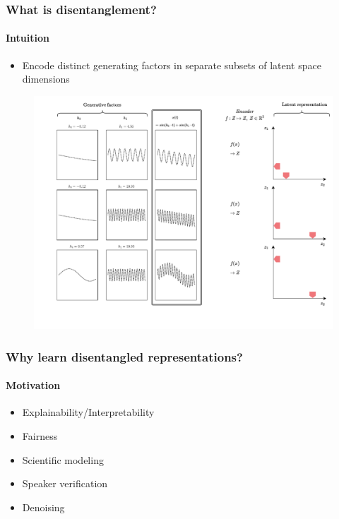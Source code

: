 \documentclass[9pt]{beamer}
\begin{document}
\begin{frame}
\frametitle{What is disentanglement?}
\framesubtitle{Intuition}
	\begin{itemize}%
	\item Encode distinct generating factors in separate subsets of latent space dimensions
	\end{itemize}
\begin{figure}
	\includegraphics[width=.93\linewidth]{figures/intution_3x3.pdf}
\end{figure}
\end{frame} 





\begin{frame}
\frametitle{Why learn disentangled representations?}
\framesubtitle{Motivation}
\begin{itemize}%
	\item Explainability/Interpretability
	\item Fairness
	\item Scientific modeling %
	\item Speaker verification %
	\item Denoising
\end{itemize}
\end{frame} 
\end{document}
